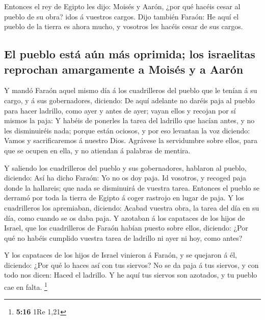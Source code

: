  Entonces el rey de Egipto les dijo: Moisés y Aarón, ¿por
qué hacéis cesar al pueblo de su obra? idos á vuestros cargos.
 Dijo también Faraón: He aquí el pueblo de la tierra es
ahora mucho, y vosotros les hacéis cesar de sus cargos.

\hypertarget{el-pueblo-estuxe1-auxfan-muxe1s-oprimida-los-israelitas-reprochan-amargamente-a-moisuxe9s-y-a-aaruxf3n}{%
\subsection{El pueblo está aún más oprimida; los israelitas reprochan
amargamente a Moisés y a
Aarón}\label{el-pueblo-estuxe1-auxfan-muxe1s-oprimida-los-israelitas-reprochan-amargamente-a-moisuxe9s-y-a-aaruxf3n}}

 Y mandó Faraón aquel mismo día á los cuadrilleros del
pueblo que le tenían á su cargo, y á sus gobernadores, diciendo:
 De aquí adelante no daréis paja al pueblo para hacer
ladrillo, como ayer y antes de ayer; vayan ellos y recojan por sí mismos
la paja:  Y habéis de ponerles la tarea del ladrillo que
hacían antes, y no les disminuiréis nada; porque están ociosos, y por
eso levantan la voz diciendo: Vamos y sacrificaremos á nuestro Dios.
 Agrávese la servidumbre sobre ellos, para que se ocupen
en ella, y no atiendan á palabras de mentira.

 Y saliendo los cuadrilleros del pueblo y sus
gobernadores, hablaron al pueblo, diciendo: Así ha dicho Faraón: Yo no
os doy paja.  Id vosotros, y recoged paja donde la
hallareis; que nada se disminuirá de vuestra tarea. 
Entonces el pueblo se derramó por toda la tierra de Egipto á coger
rastrojo en lugar de paja.  Y los cuadrilleros los
apremiaban, diciendo: Acabad vuestra obra, la tarea del día en su día,
como cuando se os daba paja.  Y azotaban á los capataces
de los hijos de Israel, que los cuadrilleros de Faraón habían puesto
sobre ellos, diciendo: ¿Por qué no habéis cumplido vuestra tarea de
ladrillo ni ayer ni hoy, como antes?

 Y los capataces de los hijos de Israel vinieron á
Faraón, y se quejaron á él, diciendo: ¿Por qué lo haces así con tus
siervos?  No se da paja á tus siervos, y con todo nos
dicen: Haced el ladrillo. Y he aquí tus siervos son azotados, y tu
pueblo cae en falta. \footnote{\textbf{5:16} 1Re 1,21}

